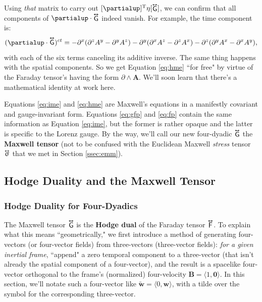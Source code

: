 \documentclass[12pt]{article}
\renewcommand{\vv}[1]{\mathbf{#1}}
\newcommand{\tightoverset}[2]{%
  \mathop{#2}\limits^{\vbox to -.5ex{\kern-0.75ex\hbox{$#1$}\vss}}}
\newcommand{\inlinedy}[1]{\tightoverset{\text{\tiny$\bm\leftrightarrow$}}{#1}}
\newcommand{\capdy}[1]{ \overset{ \text{\tiny$\bm\leftrightarrow$} }{\vphantom{\text{\small{A}}}\smash{#1}} }
\begin{document}
Using \emph{that} matrix to carry out $[\partialup]^{\mathrm{T}} \eta [\inlinedy{\mathsf{G}}]$, we can confirm that all components of $\partialup \cdot \inlinedy{\mathsf{G}}$ indeed vanish. For example, the time component is:
\begin{equation*}
(\partialup \cdot \capdy{\mathsf{G}})^{ct} = - \partial^x ( \partial^z A^y - \partial^y A^z ) - \partial^y ( \partial^x A^z - \partial^z A^x ) - \partial^z ( \partial^y A^x - \partial^x A^y ) ,
\end{equation*}
with each of the six terms canceling its additive inverse. The same thing happens with the spatial components. So we get Equation \ref{eq:hme} ``for free" by virtue of the Faraday tensor's having the form $\partialup \wedge \vv A$. We'll soon learn that there's a mathematical identity at work here.

Equations \ref{eq:ime} and \ref{eq:hme} are Maxwell's equations in a manifestly covariant and gauge-invariant form. Equations \ref{eq:gfp} and \ref{eq:fp} contain the same information as Equation \ref{eq:ime}, but the former is rather opaque and the latter is specific to the Lorenz gauge. By the way, we'll call our new four-dyadic $\inlinedy{\mathsf{G}}$ the \textbf{Maxwell tensor} (not to be confused with the Euclidean Maxwell \emph{stress} tensor $\inlinedy{\upsigma}$ that we met in Section \ref{ssec:emm}).


\subsection{Hodge Duality and the Maxwell Tensor}

\subsubsection{Hodge Duality for Four-Dyadics}\label{sssec:hd}

The Maxwell tensor $\inlinedy{\mathsf{G}}$ is the \textbf{Hodge dual} of the Faraday tensor $\inlinedy{\mathsf{F}}$. To explain what this means ``geometrically," we first introduce a method of generating four-vectors (or four-vector fields) from three-vectors (three-vector fields): \emph{for a given inertial frame}, ``append" a zero temporal component to a three-vector (that isn't already the spatial component of a four-vector), and the result is a spacelike four-vector orthogonal to the frame's (normalized) four-velocity $\vv B = \langle 1, \vv 0 \rangle$. In this section, we'll notate such a four-vector like $\tilde{\vv w} = \langle 0, \vv w \rangle$, with a tilde over the symbol for the corresponding three-vector.
\end{document}

